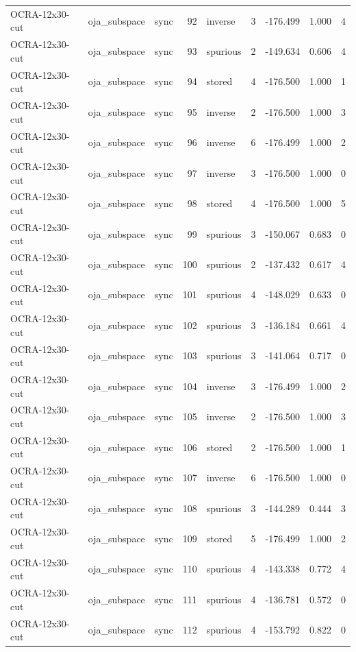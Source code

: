 \begin{tabular}{lllrlrrrr}
OCRA-12x30-cut & oja\_subspace & sync & 92 & inverse & 3 & -176.499 & 1.000 & 4 \\
OCRA-12x30-cut & oja\_subspace & sync & 93 & spurious & 2 & -149.634 & 0.606 & 4 \\
OCRA-12x30-cut & oja\_subspace & sync & 94 & stored & 4 & -176.500 & 1.000 & 1 \\
OCRA-12x30-cut & oja\_subspace & sync & 95 & inverse & 2 & -176.500 & 1.000 & 3 \\
OCRA-12x30-cut & oja\_subspace & sync & 96 & inverse & 6 & -176.499 & 1.000 & 2 \\
OCRA-12x30-cut & oja\_subspace & sync & 97 & inverse & 3 & -176.500 & 1.000 & 0 \\
OCRA-12x30-cut & oja\_subspace & sync & 98 & stored & 4 & -176.500 & 1.000 & 5 \\
OCRA-12x30-cut & oja\_subspace & sync & 99 & spurious & 3 & -150.067 & 0.683 & 0 \\
OCRA-12x30-cut & oja\_subspace & sync & 100 & spurious & 2 & -137.432 & 0.617 & 4 \\
OCRA-12x30-cut & oja\_subspace & sync & 101 & spurious & 4 & -148.029 & 0.633 & 0 \\
OCRA-12x30-cut & oja\_subspace & sync & 102 & spurious & 3 & -136.184 & 0.661 & 4 \\
OCRA-12x30-cut & oja\_subspace & sync & 103 & spurious & 3 & -141.064 & 0.717 & 0 \\
OCRA-12x30-cut & oja\_subspace & sync & 104 & inverse & 3 & -176.499 & 1.000 & 2 \\
OCRA-12x30-cut & oja\_subspace & sync & 105 & inverse & 2 & -176.500 & 1.000 & 3 \\
OCRA-12x30-cut & oja\_subspace & sync & 106 & stored & 2 & -176.500 & 1.000 & 1 \\
OCRA-12x30-cut & oja\_subspace & sync & 107 & inverse & 6 & -176.500 & 1.000 & 0 \\
OCRA-12x30-cut & oja\_subspace & sync & 108 & spurious & 3 & -144.289 & 0.444 & 3 \\
OCRA-12x30-cut & oja\_subspace & sync & 109 & stored & 5 & -176.499 & 1.000 & 2 \\
OCRA-12x30-cut & oja\_subspace & sync & 110 & spurious & 4 & -143.338 & 0.772 & 4 \\
OCRA-12x30-cut & oja\_subspace & sync & 111 & spurious & 4 & -136.781 & 0.572 & 0 \\
OCRA-12x30-cut & oja\_subspace & sync & 112 & spurious & 4 & -153.792 & 0.822 & 0 \\

\end{tabular}
